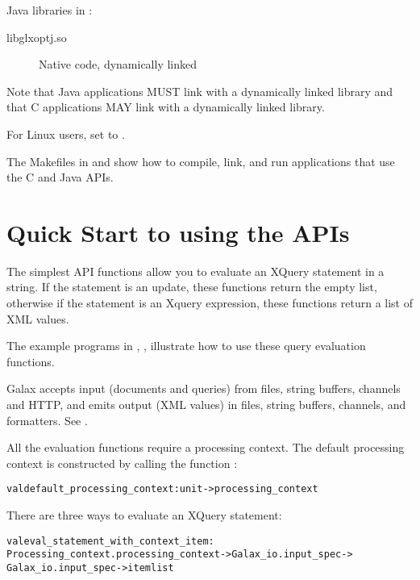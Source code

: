Java libraries in :
\begin{description}
\item[libglxoptj.so]  Native code, dynamically linked 
\end{description}

  Note that Java applications MUST link with a dynamically linked
  library and that C applications MAY link with a dynamically linked
  library.  

  For Linux users, set  to .

  The Makefiles in  and  show how to
  compile, link, and run applications that use the C and Java APIs.

\section{Quick Start to using the APIs}
\label{sec:quickstart}

  The simplest API functions allow you to evaluate an XQuery statement
  in a string.  If the statement is an update, these functions return
  the empty list, otherwise if the statement is an Xquery expression,
  these functions return a list of XML values.

The example programs in
, 
,
illustrate how to use these query evaluation functions. 

Galax accepts input (documents and queries) from files, string buffers, channels and HTTP, and
emits output (XML values) in files, string buffers, channels, and formatters. See
. 

All the evaluation functions require a processing context.  The
default processing context is constructed by calling the function :
\begin{alltt}
  val default_processing_context : unit -> processing_context
\end{alltt}

There are three ways to evaluate an XQuery statement:
\begin{alltt}
    val eval\_statement\_with\_context\_item : 
      Processing\_context.processing\_context -> Galax\_io.input\_spec -> 
        Galax\_io.input\_spec -> item list
\end{alltt}

